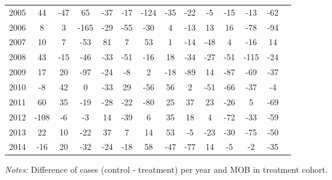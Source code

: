 \begin{table}[H]
\begin{threeparttable}
{\begin{tabular}{l*{13}{c}}
2005        &          44&         -47&          65&         -37&         -17&        -124&         -35&         -22&          -5&         -15&         -13&         -62\\
2006        &           8&           3&        -165&         -29&         -55&         -30&           4&         -13&          13&          16&         -78&         -94\\
2007        &          10&           7&         -53&          81&           7&          53&           1&         -14&         -48&           4&         -16&          14\\
2008        &          43&         -15&         -46&         -33&         -51&         -16&          18&         -34&         -27&         -51&        -115&         -24\\
2009        &          17&          20&         -97&         -24&          -8&           2&         -18&         -89&          14&         -87&         -69&         -37\\
2010        &          -8&          42&           0&         -33&          29&         -56&          56&           2&         -51&         -66&         -37&          -4\\
2011        &          60&          35&         -19&         -28&         -22&         -80&          25&          37&          23&         -26&           5&         -69\\
2012        &        -108&          -6&          -3&          14&         -39&           6&          35&          18&           4&         -72&         -33&         -59\\
2013        &          22&          10&         -22&          37&           7&          14&          53&          -5&         -23&         -30&         -75&         -50\\
2014        &         -16&          20&         -32&         -24&         -18&          58&         -47&         -77&          14&          -5&          -2&         -35\\
 \bottomrule \end{tabular} } \begin{tablenotes} \item \scriptsize \emph{Notes:} Difference of cases (control - treatment) per year and MOB in treatment cohort. \end{tablenotes} \end{threeparttable} \end{table} 
